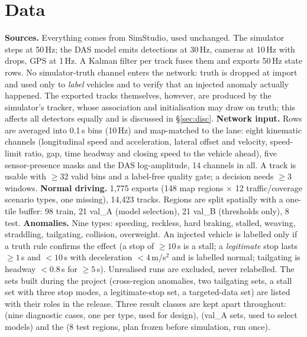 \documentclass[10pt,a4paper,twocolumn]{article}
\begin{document}
\section{Data}
\textbf{Sources.} Everything comes from SimStudio, used unchanged. The simulator steps at 50\,Hz; the DAS model emits detections at 30\,Hz, cameras at 10\,Hz with drops, GPS at 1\,Hz. A Kalman filter per track fuses them and exports 50\,Hz state rows. No simulator-truth channel enters the network: truth is dropped at import and used only to \emph{label} vehicles and to verify that an injected anomaly actually happened. The exported tracks themselves, however, are produced by the simulator's tracker, whose association and initialisation may draw on truth; this affects all detectors equally and is discussed in \S\ref{sec:disc}.
\textbf{Network input.} Rows are averaged into 0.1\,s bins (10\,Hz) and map-matched to the lane: eight kinematic channels (longitudinal speed and acceleration, lateral offset and velocity, speed-limit ratio, gap, time headway and closing speed to the vehicle ahead), five sensor-presence masks and the DAS log-amplitude, 14 channels in all. A track is usable with $\ge32$ valid bins and a label-free quality gate; a decision needs $\ge3$ windows.
\textbf{Normal driving.} 1{,}775 exports (148 map regions $\times$ 12 traffic/coverage scenario types, one missing), 14{,}423 tracks. Regions are split spatially with a one-tile buffer: 98 train, 21 val\_A (model selection), 21 val\_B (thresholds only), 8 test.
\textbf{Anomalies.} Nine types: speeding, reckless, hard braking, stalled, weaving, straddling, tailgating, collision, overweight. An injected vehicle is labelled only if a truth rule confirms the effect (a stop of $\ge10$\,s is a stall; a \emph{legitimate} stop lasts $\ge1$\,s and $<10$\,s with deceleration $<4$\,m/s$^2$ and is labelled normal; tailgating is headway $<0.8$\,s for $\ge5$\,s). Unrealised runs are excluded, never relabelled. The sets built during the project (cross-region anomalies, two tailgating sets, a stall set with three stop modes, a legitimate-stop set, a targeted-data set) are listed with their roles in the release. Three result classes are kept apart throughout: \dev{} (nine diagnostic cases, one per type, used for design), \val{} (val\_A sets, used to select models) and the \ft{} (8 test regions, plan frozen before simulation, run once).
\end{document}
